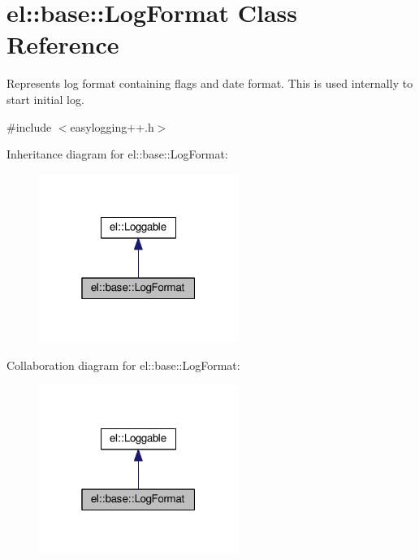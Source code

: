 \hypertarget{classel_1_1base_1_1_log_format}{}\section{el\+:\+:base\+:\+:Log\+Format Class Reference}
\label{classel_1_1base_1_1_log_format}


Represents log format containing flags and date format. This is used internally to start initial log.  




{\ttfamily \#include $<$easylogging++.\+h$>$}



Inheritance diagram for el\+:\+:base\+:\+:Log\+Format\+:
\nopagebreak
\begin{figure}[H]
\begin{center}
\leavevmode
\includegraphics[width=184pt]{classel_1_1base_1_1_log_format__inherit__graph}
\end{center}
\end{figure}


Collaboration diagram for el\+:\+:base\+:\+:Log\+Format\+:
\nopagebreak
\begin{figure}[H]
\begin{center}
\leavevmode
\includegraphics[width=184pt]{classel_1_1base_1_1_log_format__coll__graph}
\end{center}
\end{figure}
